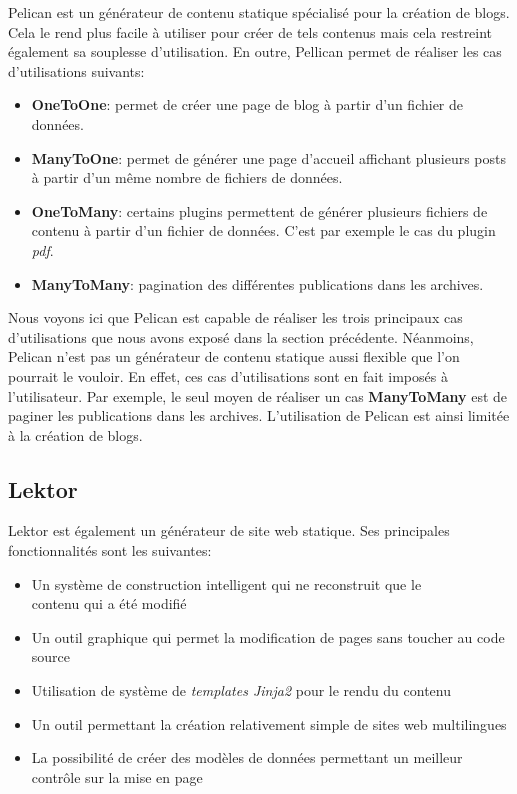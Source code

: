 	Pelican est un générateur de contenu statique spécialisé pour la création de blogs. Cela le rend plus facile à utiliser pour créer de tels contenus mais cela restreint également sa souplesse d'utilisation. En outre, Pellican permet de réaliser les cas d'utilisations suivants:\\
	
	\begin{itemize}
		\item \textbf{OneToOne}: permet de créer une page de blog à partir d'un fichier de données.
		\item \textbf{ManyToOne}: permet de générer une page d'accueil affichant plusieurs posts à partir d'un même nombre de fichiers de données.
		\item \textbf{OneToMany}: certains plugins permettent de générer plusieurs fichiers de contenu à partir d'un fichier de données. C'est par exemple le cas du plugin \textit{pdf}.
		\item \textbf{ManyToMany}: pagination des différentes publications dans les archives.
	\end{itemize}
	
	Nous voyons ici que Pelican est capable de réaliser les trois principaux cas d'utilisations que nous avons exposé dans la section précédente. Néanmoins, Pelican n'est pas un générateur de contenu statique aussi flexible que l'on pourrait le vouloir. En effet, ces cas d'utilisations sont en fait imposés à l'utilisateur. Par exemple, le seul moyen de réaliser un cas \textbf{ManyToMany} est de paginer les publications dans les archives. L'utilisation de Pelican est ainsi limitée à la création de blogs.
	
	\subsection*{Lektor}
	Lektor \cite{Lektor} est également un générateur de site web statique. Ses principales fonctionnalités sont les suivantes:
	
	\begin{itemize}
		\item Un système de construction intelligent qui ne reconstruit que le \\contenu qui a été modifié
		\item Un outil graphique qui permet la modification de pages sans toucher au code source
		\item Utilisation de système de \textit{templates Jinja2} pour le rendu du contenu
		\item Un outil permettant la création relativement simple de sites web multilingues
		\item La possibilité de créer des modèles de données permettant un meilleur contrôle sur la mise en page
	\end{itemize}
	

